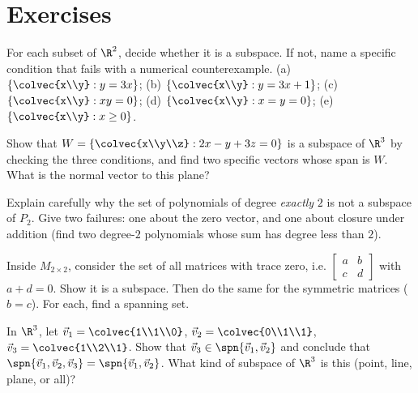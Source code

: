 \section*{Exercises}

\begin{exercise}\label{ch11:ex-classify-r2}
For each subset of $\R^2$, decide whether it is a subspace. If not, name a specific
condition that fails with a numerical counterexample.
(a) $\{\colvec{x\\y} : y = 3x\}$; \quad (b) $\{\colvec{x\\y} : y = 3x + 1\}$;
(c) $\{\colvec{x\\y} : xy = 0\}$; \quad (d) $\{\colvec{x\\y} : x = y = 0\}$;
(e) $\{\colvec{x\\y} : x \ge 0\}$.
\end{exercise}

\begin{exercise}\label{ch11:ex-r3-plane}
Show that $W = \{\colvec{x\\y\\z} : 2x - y + 3z = 0\}$ is a subspace of $\R^3$ by checking
the three conditions, and find two specific vectors whose span is $W$. What is the normal
vector to this plane?
\end{exercise}

\begin{exercise}\label{ch11:ex-degree-two}
Explain carefully why the set of polynomials of degree \emph{exactly} $2$ is not a
subspace of $P_2$. Give two failures: one about the zero vector, and one about closure
under addition (find two degree-$2$ polynomials whose sum has degree less than $2$).
\end{exercise}

\begin{exercise}\label{ch11:ex-matrix-subspace}
Inside $M_{2\times 2}$, consider the set of all matrices with trace zero, i.e.
$\begin{bmatrix}a&b\\c&d\end{bmatrix}$ with $a + d = 0$. Show it is a subspace. Then do the
same for the symmetric matrices ($b = c$). For each, find a spanning set.
\end{exercise}

\begin{exercise}\label{ch11:ex-span-equal}
In $\R^3$, let $\vec{v}_1 = \colvec{1\\1\\0}$, $\vec{v}_2 = \colvec{0\\1\\1}$,
$\vec{v}_3 = \colvec{1\\2\\1}$. Show that $\vec{v}_3 \in \spn\{\vec{v}_1,\vec{v}_2\}$ and
conclude that $\spn\{\vec{v}_1,\vec{v}_2,\vec{v}_3\} = \spn\{\vec{v}_1,\vec{v}_2\}$. What
kind of subspace of $\R^3$ is this (point, line, plane, or all)?
\end{exercise}


